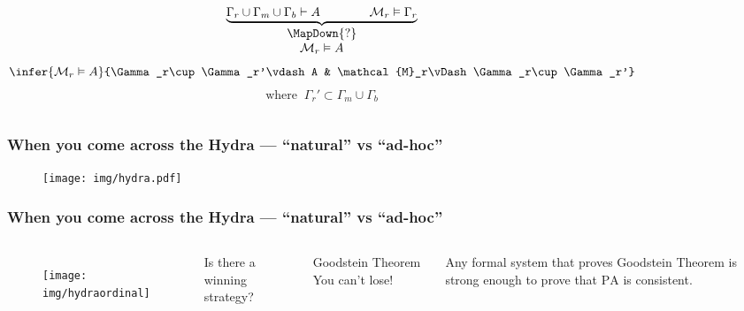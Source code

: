 \documentclass[UTF8,aspectratio=43,11pt,colorlinks,compress,openany]{beamer}%
\begin{document}
\begin{frame}
\begin{figure}
{\begin{minipage}{\textwidth}
		\end{minipage}}
	\end{figure}
	\begin{columns}
			\[
			\begin{matrix}
			\underbrace{\Gamma_r\cup\Gamma_m\cup\Gamma_b\vdash A\qquad \qquad\mathcal{M}_r\vDash\Gamma_r}\\
			\MapDown{?}\\
			\mathcal{M}_r\vDash A
			\end{matrix}
			\]
			\[
			\infer{\mathcal{M}_r\vDash A}{\Gamma_r\cup\Gamma_r'\vdash A
				& \mathcal{M}_r\vDash\Gamma_r\cup\Gamma_r'}
			\]
			\[\text{where}\;\;\Gamma_r'\subset\Gamma_m\cup\Gamma_b\]
	\end{columns}
\end{frame}

\begin{frame}\frametitle{\small When you come across the Hydra --- ``natural'' vs ``ad-hoc''}
	\begin{figure}
		\texttt{[image: img/hydra.pdf]}
	\end{figure}
\end{frame}

\begin{frame}\frametitle{\small When you come across the Hydra --- ``natural'' vs ``ad-hoc''}
	\begin{columns}
		\column{0.5\textwidth}
			\begin{figure}
				\texttt{[image: img/hydraordinal]}
			\end{figure}
		\column{0.5\textwidth}
			\begin{problem}
				Is there a winning strategy?
			\end{problem}
			\begin{block}{Goodstein Theorem}
				You can't lose!
			\end{block}
			\begin{theorem}
				Any formal system that proves Goodstein Theorem is strong enough to prove that $\mathrm{PA}$ is consistent.
			\end{theorem}
	\end{columns}
\end{frame}
\end{document}
